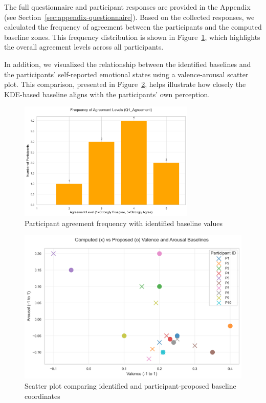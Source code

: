 The full questionnaire and participant responses are provided in the Appendix (see Section~\ref{sec:appendix-questionnaire}). Based on the collected responses, we calculated the frequency of agreement between the participants and the computed baseline zones. This frequency distribution is shown in Figure~\ref{fig:baseline-agreement-bar}, which highlights the overall agreement levels across all participants.

In addition, we visualized the relationship between the identified baselines and the participants’ self-reported emotional states using a valence-arousal scatter plot. This comparison, presented in Figure~\ref{fig:baseline-scatter-plot}, helps illustrate how closely the KDE-based baseline aligns with the participants' own perception.

\begin{figure}[H]
    \centering
    \includegraphics[width=0.75\textwidth]{img/chapter_04/baseline/agreement_bar.png}
    \caption{Participant agreement frequency with identified baseline values}
    \label{fig:baseline-agreement-bar}
\end{figure}

\begin{figure}[h]
    \centering
    \includegraphics[width=1\textwidth]{img/chapter_04/baseline/valence_arousal_scatter.png}
    \caption{Scatter plot comparing identified and participant-proposed baseline coordinates}
    \label{fig:baseline-scatter-plot}
\end{figure}


